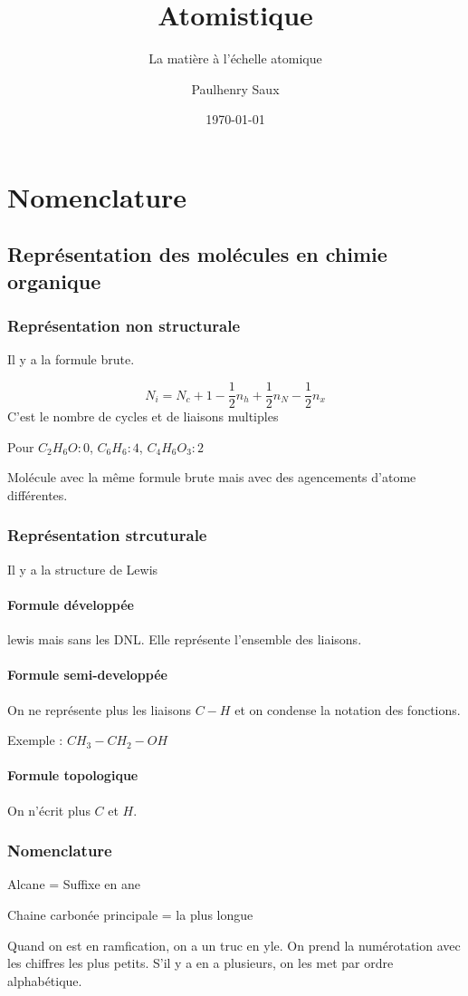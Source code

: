\documentclass[french]{yLectureNote}
\title{Atomistique}
\subtitle{La matière à l'échelle atomique}
\author{Paulhenry Saux}
\date{\today}
\begin{document}
\setcounter{chapter}{4}
\chapter{Nomenclature}
\section{Représentation des molécules en chimie organique}
\subsection{Représentation non structurale}
Il y a la formule brute.
\begin{theorem}
\[N_i = N_c+ 1-\frac{1}{2}n_h+\frac12 n_N - \frac12 n_x\]
C'est le nombre de cycles et de liaisons multiples
\end{theorem}
Pour $C_2H_6O : 0$, $C_6H_6 :4$, $C_4H_6O_3 :2$

\begin{definition}[Isomère]
Molécule avec la m\^eme formule brute mais avec des agencements d'atome différentes.
\end{definition}
\subsection{Représentation strcuturale}
Il y a la structure de Lewis
\subsubsection{Formule développée}
lewis mais sans les DNL. Elle représente l'ensemble des liaisons.
\subsubsection{Formule semi-developpée}
On ne représente plus les liaisons $C-H$ et on condense la notation des fonctions.

Exemple : $CH_3-CH_2-OH$
\subsubsection{Formule topologique}
On n'écrit plus $C$ et $H$.
\subsection{Nomenclature}
Alcane = Suffixe en ane

Chaine carbonée principale = la plus longue

Quand on est en ramfication, on a un truc en yle. On prend la numérotation avec les chiffres les plus petits. S'il y a en a plusieurs, on les met par ordre alphabétique.
\end{document}
